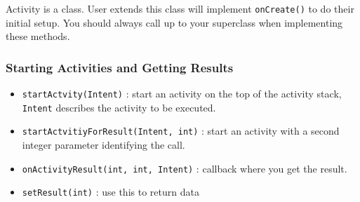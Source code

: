 Activity is a class. User extends this class will implement \texttt{onCreate()}
to do their initial setup. You should always call up to your superclass when
implementing these methods.


\subsubsection{Starting Activities and Getting Results}

\begin{itemize}
\item 
  \texttt{startActvity(Intent)} : start an activity on the top of the activity
  stack, \texttt{Intent} describes the activity to be executed.
\item
  \texttt{startActvitiyForResult(Intent, int)} : start an activity with a second
  integer parameter identifying the call.
\item 
  \texttt{onActivityResult(int, int, Intent)} : callback where you get the result.
\item 
  \texttt{setResult(int)} : use this to return data
\end{itemize}

  



